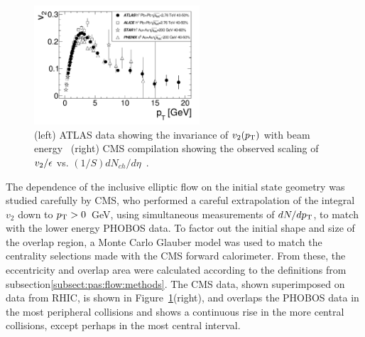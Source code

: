 \begin{figure}[!tb]
\begin{center}
\includegraphics[width=0.55\textwidth]{flowcorrelations_figs/atlas_v2_fig_06.pdf}
\caption[]{(left) ATLAS data showing the invariance of $\mbox{$v_2$}( \mbox{$p_{\mathrm{T}}$} )$
  with beam energy~\cite{ATLAS:2011ah} (right) CMS compilation showing
  the observed scaling of $\mbox{$v_2$} /\epsilon$ vs. $(1/S)
  dN_{ch}/d\eta$~\cite{Chatrchyan:2012ta}.}
\label{fig:pas:fc:scaling}
\end{center}
\end{figure}
The dependence of the inclusive elliptic flow on the initial state geometry was studied carefully by CMS, who
performed a careful extrapolation of the integral $v_2$ down to $\mbox{$p_{\mathrm{T}}$}>0$~GeV, using simultaneous measurements of
$dN/d\mbox{$p_{\mathrm{T}}$}$, to match with the lower energy PHOBOS data.
To factor out the initial shape and size of the overlap region, a Monte Carlo Glauber model was used to match
the centrality selections made with the CMS forward calorimeter.
From these, the eccentricity and overlap area were calculated according to the definitions from
subsection\ref{subsect:pas:flow:methods}.  The CMS data, shown superimposed on data from RHIC, is shown in
Figure~\ref{fig:pas:fc:scaling}(right), and overlaps the PHOBOS data in the most peripheral collisions and
shows a continuous rise in the more central collisions, except perhaps in the most central interval.

